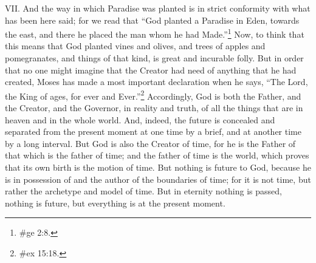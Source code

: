 VII. And the way in which Paradise was planted is in strict conformity with what has been here said;
for we read that ``God planted a Paradise in Eden, towards the east, and there he placed the man
whom he had Made.''\footnote{\#ge 2:8.} Now, to think that this means that God planted vines and olives,
and trees of apples and pomegranates, and things of that kind, is great and incurable folly. But in
order that no one might imagine that the Creator had need of anything that he had created, Moses
has made a most important declaration when he says, ``The Lord, the King of ages, for ever and
Ever.''\footnote{\#ex 15:18.} Accordingly, God is both the Father, and the Creator, and the Governor, in
reality and truth, of all the things that are in heaven and in the whole world. And, indeed, the future is
concealed and separated from the present moment at one time by a brief, and at another time by a
long interval. But God is also the Creator of time, for he is the Father of that which is the father of
time; and the father of time is the world, which proves that its own birth is the motion of time. But
nothing is future to God, because he is in possession of and the author of the boundaries of time;
for it is not time, but rather the archetype and model of time. But in eternity nothing is passed,
nothing is future, but everything is at the present moment.

